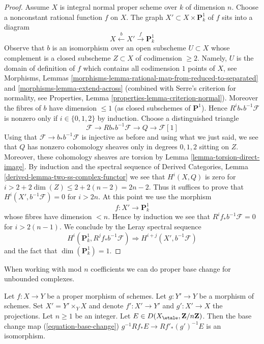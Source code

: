 \begin{proof}
\medskip\noindent
Assume $X$ is integral normal proper scheme over $k$ of dimension $n$.
Choose a nonconstant rational function $f$ on $X$. The graph
$X' \subset X \times \mathbf{P}^1_k$ of $f$ sits into a diagram
$$
X \xleftarrow{b} X' \xrightarrow{f} \mathbf{P}^1_k
$$
Observe that $b$ is an isomorphism over an open subscheme
$U \subset X$ whose complement is a closed subscheme
$Z \subset X$ of codimension $\geq 2$. Namely, $U$ is the
domain of definition of $f$ which contains all codimension $1$
points of $X$, see
Morphisms, Lemmas \ref{morphisms-lemma-rational-map-from-reduced-to-separated}
and \ref{morphisms-lemma-extend-across}
(combined with Serre's criterion for normality, see
Properties, Lemma \ref{properties-lemma-criterion-normal}).
Moreover the fibres of $b$ have dimension $\leq 1$ (as closed subschemes
of $\mathbf{P}^1$). Hence $R^ib_*b^{-1}\mathcal{F}$ is nonzero only
if $i \in \{0, 1, 2\}$ by induction. Choose a distinguished triangle
$$
\mathcal{F} \to Rb_*b^{-1}\mathcal{F} \to Q \to \mathcal{F}[1]
$$
Using that $\mathcal{F} \to b_*b^{-1}\mathcal{F}$ is injective
as before and using what we just said, we see that $Q$ has nonzero
cohomology sheaves only in degrees $0, 1, 2$ sitting on $Z$.
Moreover, these cohomology sheaves are torsion by
Lemma \ref{lemma-torsion-direct-image}.
By induction and the spectral sequence of
Derived Categories, Lemma \ref{derived-lemma-two-ss-complex-functor}
we see that $H^i(X, Q)$ is zero for
$i > 2 + 2\dim(Z) \leq 2 + 2(n - 2) = 2n - 2$. Thus it suffices
to prove that $H^i(X', b^{-1}\mathcal{F}) = 0$ for
$i > 2n$. At this point we use the morphism
$$
f : X' \to \mathbf{P}^1_k
$$
whose fibres have dimension $< n$. Hence by induction we see that
$R^if_*b^{-1}\mathcal{F} = 0$ for $i > 2(n - 1)$.
We conclude by the Leray spectral sequence
$$
H^i(\mathbf{P}^1_k, R^jf_*b^{-1}\mathcal{F})
\Rightarrow
H^{i + j}(X', b^{-1}\mathcal{F})
$$
and the fact that $\dim(\mathbf{P}^1_k) = 1$.
\end{proof}

\noindent
When working with mod $n$ coefficients we can do proper
base change for unbounded complexes.

\begin{lemma}
\label{lemma-proper-base-change-mod-n}
Let $f : X \to Y$ be a proper morphism of schemes. Let $g : Y' \to Y$ be
a morphism of schemes. Set $X' = Y' \times_Y X$ and denote
$f' : X' \to Y'$ and $g' : X' \to X$ the projections.
Let $n \geq 1$ be an integer.
Let $E \in D(X_\etale, \mathbf{Z}/n\mathbf{Z})$.
Then the base change map (\ref{equation-base-change})
$g^{-1}Rf_*E \to Rf'_*(g')^{-1}E$
is an isomorphism.
\end{lemma}

